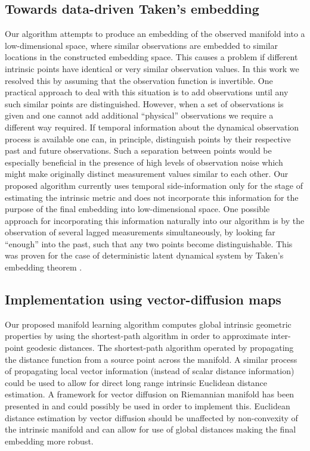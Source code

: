 	\subsection{Towards data-driven Taken's embedding}
	
	Our algorithm attempts to produce an embedding of the observed manifold
	into a low-dimensional space, where similar observations are embedded
	to similar locations in the constructed embedding space. This causes
	a problem if different intrinsic points have identical or very similar
	observation values. In this work we resolved this by assuming that
	the observation function is invertible. One practical approach to
	deal with this situation is to add observations until any such similar
	points are distinguished. However, when a set of observations is given
	and one cannot add additional ``physical'' observations we require
	a different way required. If temporal information about the dynamical
	observation process is available one can, in principle, distinguish
	points by their respective past and future observations. Such a separation
	between points would be especially beneficial in the presence of high
	levels of observation noise which might make originally distinct measurement
	values similar to each other. Our proposed algorithm currently uses
	temporal side-information only for the stage of estimating the intrinsic
	metric and does not incorporate this information for the purpose of
	the final embedding into low-dimensional space. One possible approach
	for incorporating this information naturally into our algorithm is
	by the observation of several lagged measurements simultaneously,
	by looking far ``enough'' into the past, such that any two points
	become distinguishable. This was proven for the case of deterministic
	latent dynamical system by Taken's embedding theorem \cite{takens1981detecting}.
	
	\subsection{Implementation using vector-diffusion maps}
	
	Our proposed manifold learning algorithm computes global intrinsic
	geometric properties by using the shortest-path algorithm in order
	to approximate inter-point geodesic distances. The shortest-path algorithm
	operated by propagating the distance function from a source point
	across the manifold. A similar process of propagating local vector
	information (instead of scalar distance information) could be used
	to allow for direct long range intrinsic Euclidean distance estimation.
	A framework for vector diffusion on Riemannian manifold has been presented
	in \cite{singer2012vector} and could possibly be used in order to
	implement this. Euclidean distance estimation by vector diffusion
	should be unaffected by non-convexity of the intrinsic manifold and
	can allow for use of global distances making the final embedding more
	robust.
	
